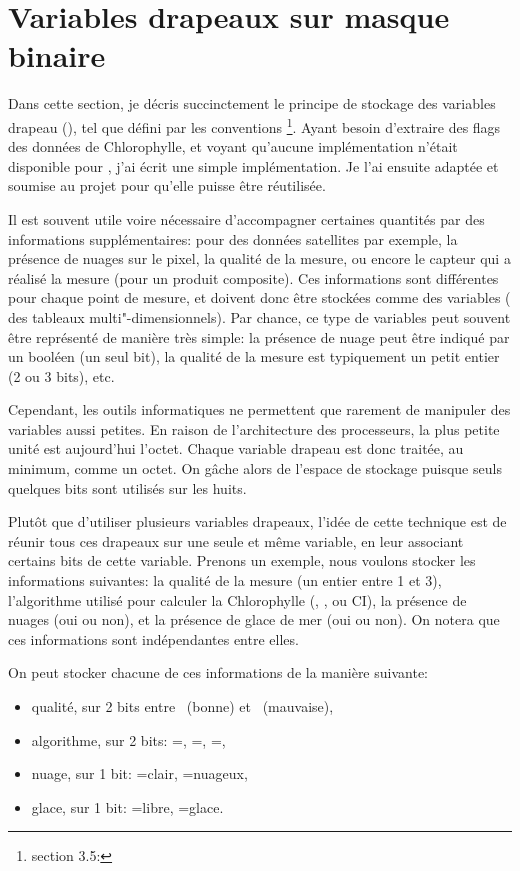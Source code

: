 

\chapter{Variables drapeaux sur masque binaire}
\label{ax:cf-flags}

Dans cette section, je décris succinctement le principe de stockage des variables drapeau (), tel que défini par les conventions \footnote{%
  \raggedleft%
  section 3.5: {\scriptsize{}}
}.
Ayant besoin d'extraire des flags des données de Chlorophylle, et voyant qu'aucune implémentation n'était disponible pour , j'ai écrit une simple implémentation.
Je l'ai ensuite adaptée et soumise au projet  pour qu'elle puisse être réutilisée.

Il est souvent utile voire nécessaire d'accompagner certaines quantités par des informations supplémentaires: pour des données satellites par exemple, la présence de nuages sur le pixel, la qualité de la mesure, ou encore le capteur qui a réalisé la mesure (pour un produit composite).
Ces informations sont différentes pour chaque point de mesure, et doivent donc être stockées comme des variables ( des tableaux multi"-dimensionnels).
Par chance, ce type de variables  peut souvent être représenté de manière très simple: la présence de nuage peut être indiqué par un booléen (un seul bit), la qualité de la mesure est typiquement un petit entier (2 ou 3 bits), etc.

Cependant, les outils informatiques ne permettent que rarement de manipuler des variables aussi petites. En raison de l'architecture des processeurs, la plus petite unité est aujourd'hui l'octet.
Chaque variable drapeau est donc traitée, au minimum, comme un octet.
On gâche alors de l'espace de stockage puisque seuls quelques bits sont utilisés sur les huits.

Plutôt que d'utiliser plusieurs variables drapeaux, l'idée de cette technique est de réunir tous ces drapeaux sur une seule et même variable, en leur associant certains bits de cette variable.
Prenons un exemple, nous voulons stocker les informations suivantes: la qualité de la mesure (un entier entre 1 et 3), l'algorithme utilisé pour calculer la Chlorophylle (, , ou CI), la présence de nuages (oui ou non), et la présence de glace de mer (oui ou non).
On notera que ces informations sont indépendantes entre elles.

On peut stocker chacune de ces informations de la manière suivante:
\begin{itemize}
  \item qualité, sur 2 bits entre ~(bonne) et ~(mauvaise),
  \item algorithme, sur 2 bits: =, =, =,
  \item nuage, sur 1 bit: =clair, =nuageux,
  \item glace, sur 1 bit: =libre, =glace.
\end{itemize}

